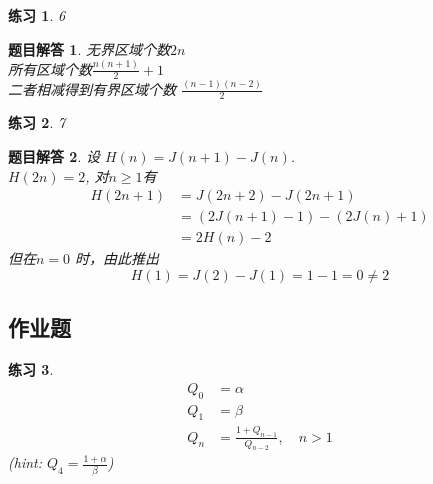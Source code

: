 \documentclass[mode=geye]{elegantnote}
\newtheorem{exercise}{练习}
\newtheorem{answer}{题目解答}
\begin{document}
\begin{exercise}6
\end{exercise}

\begin{answer}
	无界区域个数$ 2n $\\
	所有区域个数$ \frac{n(n+1)}{2}+1 $ \\
	二者相减得到有界区域个数 $ \frac{(n-1)(n-2)}{2} $
\end{answer}

\begin{exercise}7
\end{exercise}

\begin{answer}
	设 $ H(n) = J(n+1) - J(n) $.\\
	$ H(2n) = 2 $, 对$ n\geqslant 1 $有\\
	\begin{align*}
		 H(2n+1)
		 &= J(2n+2) - J(2n+1) \\
		 &= (2J(n+1)-1) - (2J(n)+1)\\
		 &= 2H(n) - 2
	\end{align*}
	但在$ n=0 $	时，由此推出
	\begin{equation*}
		H(1) = J(2)-J(1) = 1 - 1 = 0 \neq 2
	\end{equation*}
\end{answer}

\subsection{作业题}
\begin{exercise}	
	\begin{align*}
		Q_0 &= \alpha\\
		Q_1 &= \beta \\
		Q_n &= \frac{1+Q_{n-1}}{Q_{n-2}} ,\quad n>1
	\end{align*}
	(hint: $ Q_4 = \frac{1+\alpha}{\beta} $)
\end{exercise}
\end{document}
